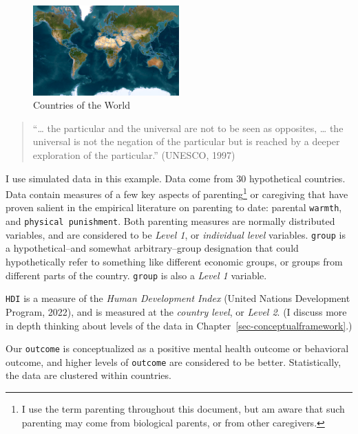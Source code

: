 \documentclass[
  letterpaper,
  DIV=11,
  numbers=noendperiod]{scrreprt}
\begin{document}
\begin{figure}

{\centering \includegraphics[width=0.5\textwidth,height=\textheight]{world.png}

}

\caption{\label{fig-world}Countries of the World}

\end{figure}

\begin{quote}
``\ldots{} the particular and the universal are not to be seen as
opposites, \ldots{} the universal is not the negation of the particular
but is reached by a deeper exploration of the particular.'' (UNESCO,
1997)
\end{quote}

I use simulated data in this example. Data come from 30 hypothetical
countries. Data contain measures of a few key aspects of
parenting\footnote{I use the term parenting throughout this document,
  but am aware that such parenting may come from biological parents, or
  from other caregivers.} or caregiving that have proven salient in the
empirical literature on parenting to date: parental \texttt{warmth}, and
\texttt{physical\ punishment}. Both parenting measures are normally
distributed variables, and are considered to be \emph{Level 1}, or
\emph{individual level} variables. \texttt{group} is a hypothetical--and
somewhat arbitrary--group designation that could hypothetically refer to
something like different economic groups, or groups from different parts
of the country. \texttt{group} is also a \emph{Level 1} variable.

\texttt{HDI} is a measure of the \emph{Human Development Index} (United
Nations Development Program, 2022), and is measured at the \emph{country
level}, or \emph{Level 2}. (I discuss more in depth thinking about
levels of the data in Chapter~\ref{sec-conceptualframework}.)

Our \texttt{outcome} is conceptualized as a positive mental health
outcome or behavioral outcome, and higher levels of \texttt{outcome} are
considered to be better. Statistically, the data are clustered within
countries.
\end{document}
